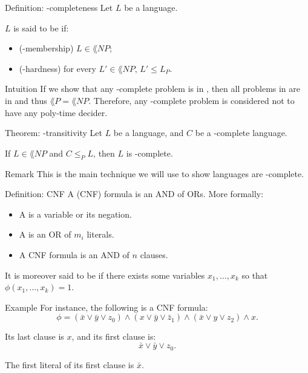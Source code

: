 \documentclass[a4paper]{article}
\begin{document}
\begin{parag}{Definition: -completeness}
    Let $L$ be a language.

    $L$ is said to be  if:
    \begin{itemize}
        \item (-membership) $L \in \lang{NP}$;
        \item (-hardness) for every $L' \in \lang{NP}$, $L' \leq L_P$.
    \end{itemize}

    \begin{subparag}{Intuition}
        If we show that any -complete problem is in , then all problems in  are in  and thus $\lang{P} = \lang{NP}$. Therefore, any -complete problem is considered not to have any poly-time decider.
    \end{subparag}
\end{parag}

\begin{parag}{Theorem: -transitivity}
    Let $L$ be a language, and $C$ be a -complete language.

    If $L \in \lang{NP}$ and $C \leq_P L$, then $L$ is -complete.

    \begin{subparag}{Remark}
        This is the main technique we will use to show languages are -complete.
    \end{subparag}
\end{parag}

\begin{parag}{Definition: CNF}
    A  (CNF) formula is an AND of ORs. More formally:
    \begin{itemize}
        \item A  is a variable or its negation.
        \item A  is an OR of $m_i$ literals.
        \item A CNF formula is an AND of $n$ clauses.
    \end{itemize}

    It is moreover said to be  if there exists some variables $x_1, \ldots, x_k$ so that $\phi\left(x_1, \ldots, x_k\right) = 1$.
    
    \begin{subparag}{Example}
        For instance, the following is a CNF formula: 
        \[\phi = \left(\bar{x} \lor \bar{y} \lor z_0\right) \land \left(x \lor \bar{y} \lor \bar{z}_1\right) \land \left(\bar{x} \lor y \lor z_2\right) \land x.\]

        Its last clause is $x$, and its first clause is: 
        \[\bar{x} \lor \bar{y} \lor z_0.\]

        The first literal of its first clause is $\bar{x}$.
    \end{subparag}
\end{parag}
\end{document}
